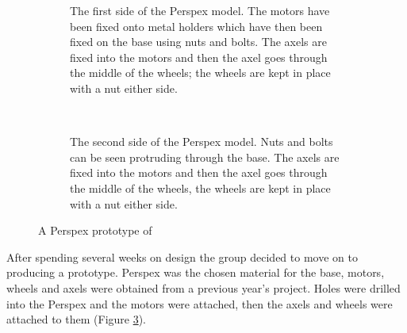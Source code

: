     \begin{figure}[htb]%
        \centering
        \begin{subfigure}[t]{0.45\textwidth}
            \caption{The first side of the Perspex model. The motors have been fixed onto metal holders which have then been fixed on the base using nuts and bolts. The axels are fixed into the motors and then the axel goes through the middle of the wheels; the wheels are kept in place with a nut either side.}
            \label{fig:wooden model 1}
        \end{subfigure}
        ~
        \begin{subfigure}[t]{0.45\textwidth}
            \caption{The second side of the Perspex model. Nuts and bolts can be seen protruding through the base. The axels are fixed into the motors and then the axel goes through the middle of the wheels, the wheels are kept in place with a nut either side.}
            \label{fig:wooden model 2}
        \end{subfigure}
        \caption{A Perspex prototype of \SandE}
        \label{fig:perspex prototype}
    \end{figure}
    After spending several weeks on design the group decided to move on to producing a prototype. Perspex was the chosen material for the base, motors, wheels and axels were obtained from a previous year's project. Holes were drilled into the Perspex and the motors were attached, then the axels and wheels were attached to them (Figure \ref{fig:perspex prototype}).
